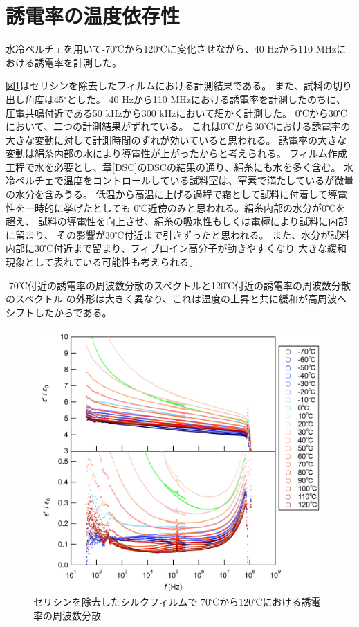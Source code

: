\documentclass[dvipdfmx,12pt,a4paper]{jreport}
\begin{document}
			\newpage
			\section{誘電率の温度依存性}
			水冷ペルチェを用いて-70℃から120℃に変化させながら、40 Hzから110 MHzにおける誘電率を計測した。
			
			図\ref{温度_誘電率_セリシンなし_全体像}はセリシンを除去したフィルムにおける計測結果である。
			また、試料の切り出し角度は45$^{\circ}$とした。
			40 Hzから110 MHzにおける誘電率を計測したのちに、
			圧電共鳴付近である50 kHzから300 kHzにおいて細かく計測した。
			0℃から30℃において、二つの計測結果がずれている。
			これは0℃から30℃における誘電率の大きな変動に対して計測時間のずれが効いていると思われる。
			誘電率の大きな変動は絹糸内部の水により導電性が上がったからと考えられる。
			フィルム作成工程で水を必要とし、章\ref{DSC}のDSCの結果の通り、絹糸にも水を多く含む。
			水冷ペルチェで温度をコントロールしている試料室は、窒素で満たしているが微量の水分を含みうる。
			低温から高温に上げる過程で霜として試料に付着して導電性を一時的に挙げたとしても
			0℃近傍のみと思われる。絹糸内部の水分が0℃を超え、
			試料の導電性を向上させ、絹糸の吸水性もしくは電極により試料に内部に留まり、
			その影響が30℃付近まで引きずったと思われる。
			また、水分が試料内部に30℃付近まで留まり、フィブロイン高分子が動きやすくなり
			大きな緩和現象として表れている可能性も考えられる。

			-70℃付近の誘電率の周波数分散のスペクトルと120℃付近の誘電率の周波数分散のスペクトル
			の外形は大きく異なり、これは温度の上昇と共に緩和が高周波へシフトしたからである。
			\begin{figure}[H]
				\centering
				\includegraphics[scale=0.85]{温度_誘電率_セリシンなし.jpg}
				\caption{セリシンを除去したシルクフィルムで-70℃から120℃における誘電率の周波数分散}
				\label{温度_誘電率_セリシンなし_全体像}
			\end{figure}
			\newpage
\end{document}
